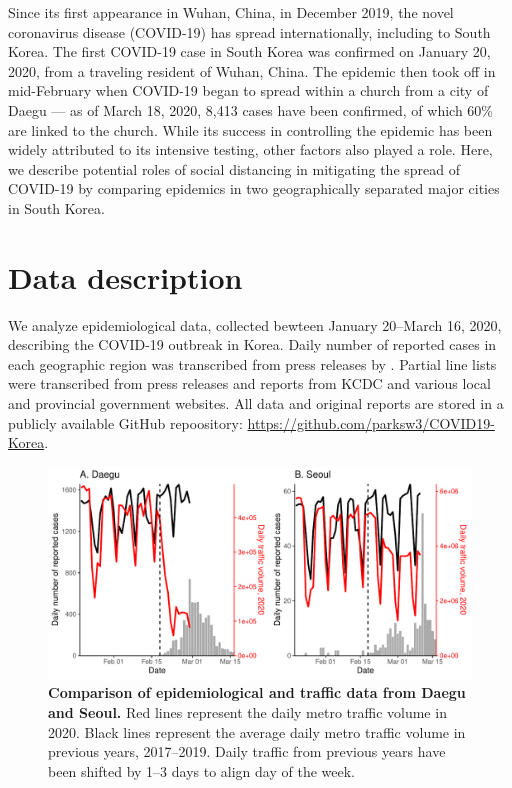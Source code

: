\documentclass[12pt]{article}
\date{\today}
\begin{document}
\begin{flushleft}{
	\Large
	\textbf{}
}
\end{flushleft}

\pagebreak

Since its first appearance in Wuhan, China, in December 2019, the novel coronavirus disease (COVID-19) has spread internationally, including to South Korea.
The first COVID-19 case in South Korea was confirmed on January 20, 2020, from a traveling resident of Wuhan, China.
The epidemic then took off in mid-February when COVID-19 began to spread within a church from a city of Daegu --- as of March 18, 2020, 8,413 cases have been confirmed, of which 60\% are linked to the church.
While its success in controlling the epidemic has been widely attributed to its intensive testing, other factors also played a role. 
Here, we describe potential roles of social distancing in mitigating the spread of COVID-19 by comparing epidemics in two geographically separated major cities in South Korea.

\section{Data description}

We analyze epidemiological data, collected bewteen January 20--March 16, 2020, describing the COVID-19 outbreak in Korea.
Daily number of reported cases in each geographic region was transcribed from press releases by \cite{kcdc}.
Partial line lists were transcribed from press releases and reports from KCDC and various local and provincial government websites.
All data and original reports are stored in a publicly available GitHub repoository: \url{https://github.com/parksw3/COVID19-Korea}.

\begin{figure}[!h]
\includegraphics[width=\textwidth]{figure_compare_report.pdf}
\caption{
\textbf{Comparison of epidemiological and traffic data from Daegu and Seoul.}
Red lines represent the daily metro traffic volume in 2020.
Black lines represent the average daily metro traffic volume in previous years, 2017--2019.
Daily traffic from previous years have been shifted by 1--3 days to align day of the week.
}
\label{fig:data}
\end{figure}
\end{document}
